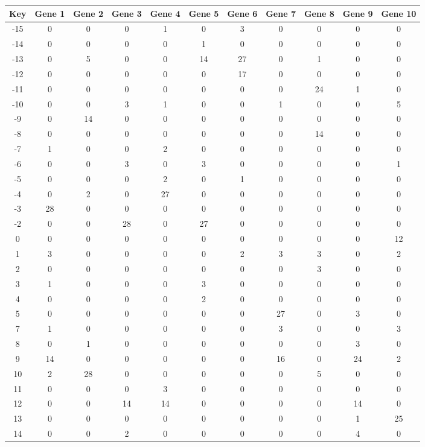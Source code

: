 \begin{tabular}{|c|c|c|c|c|c|c|c|c|c|c|}
\hline
Key & Gene 1 & Gene 2 & Gene 3 & Gene 4 & Gene 5 & Gene 6 & Gene 7 & Gene 8 & Gene 9 & Gene 10 \\
\hline
-15 & 0 & 0 & 0 & 1 & 0 & 3 & 0 & 0 & 0 & 0 \\
-14 & 0 & 0 & 0 & 0 & 1 & 0 & 0 & 0 & 0 & 0 \\
-13 & 0 & 5 & 0 & 0 & 14 & 27 & 0 & 1 & 0 & 0 \\
-12 & 0 & 0 & 0 & 0 & 0 & 17 & 0 & 0 & 0 & 0 \\
-11 & 0 & 0 & 0 & 0 & 0 & 0 & 0 & 24 & 1 & 0 \\
-10 & 0 & 0 & 3 & 1 & 0 & 0 & 1 & 0 & 0 & 5 \\
-9 & 0 & 14 & 0 & 0 & 0 & 0 & 0 & 0 & 0 & 0 \\
-8 & 0 & 0 & 0 & 0 & 0 & 0 & 0 & 14 & 0 & 0 \\
-7 & 1 & 0 & 0 & 2 & 0 & 0 & 0 & 0 & 0 & 0 \\
-6 & 0 & 0 & 3 & 0 & 3 & 0 & 0 & 0 & 0 & 1 \\
-5 & 0 & 0 & 0 & 2 & 0 & 1 & 0 & 0 & 0 & 0 \\
-4 & 0 & 2 & 0 & 27 & 0 & 0 & 0 & 0 & 0 & 0 \\
-3 & 28 & 0 & 0 & 0 & 0 & 0 & 0 & 0 & 0 & 0 \\
-2 & 0 & 0 & 28 & 0 & 27 & 0 & 0 & 0 & 0 & 0 \\
0 & 0 & 0 & 0 & 0 & 0 & 0 & 0 & 0 & 0 & 12 \\
1 & 3 & 0 & 0 & 0 & 0 & 2 & 3 & 3 & 0 & 2 \\
2 & 0 & 0 & 0 & 0 & 0 & 0 & 0 & 3 & 0 & 0 \\
3 & 1 & 0 & 0 & 0 & 3 & 0 & 0 & 0 & 0 & 0 \\
4 & 0 & 0 & 0 & 0 & 2 & 0 & 0 & 0 & 0 & 0 \\
5 & 0 & 0 & 0 & 0 & 0 & 0 & 27 & 0 & 3 & 0 \\
7 & 1 & 0 & 0 & 0 & 0 & 0 & 3 & 0 & 0 & 3 \\
8 & 0 & 1 & 0 & 0 & 0 & 0 & 0 & 0 & 3 & 0 \\
9 & 14 & 0 & 0 & 0 & 0 & 0 & 16 & 0 & 24 & 2 \\
10 & 2 & 28 & 0 & 0 & 0 & 0 & 0 & 5 & 0 & 0 \\
11 & 0 & 0 & 0 & 3 & 0 & 0 & 0 & 0 & 0 & 0 \\
12 & 0 & 0 & 14 & 14 & 0 & 0 & 0 & 0 & 14 & 0 \\
13 & 0 & 0 & 0 & 0 & 0 & 0 & 0 & 0 & 1 & 25 \\
14 & 0 & 0 & 2 & 0 & 0 & 0 & 0 & 0 & 4 & 0 \\
\hline
\end{tabular}